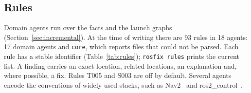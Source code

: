 \documentclass[conference]{IEEEtran}
\newcommand{\code}[1]{\texttt{#1}}
\begin{document}
\subsection{Rules}
\label{sec:rules}

Domain agents run over the facts and the launch graphs (Section~\ref{sec:incremental}). At the
time of writing there are 93 rules in 18 agents: 17 domain agents and \code{core}, which reports
files that could not be parsed. Each rule has a stable identifier (Table~\ref{tab:rules});
\code{rosfix rules} prints the current list. A finding carries an exact location, related
locations, an explanation and, where possible, a fix. Rules T005 and S003 are off by default.
Several agents encode the conventions of widely used stacks, such as Nav2~\cite{macenski2020marathon}
and ros2\_control~\cite{chitta2017roscontrol}.
\end{document}
